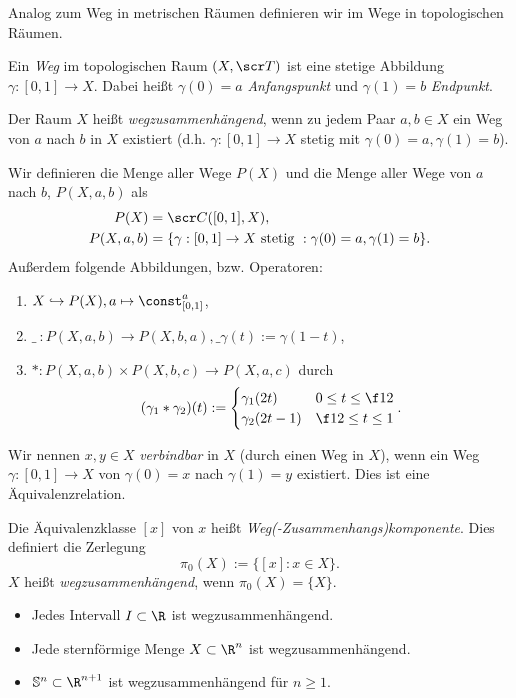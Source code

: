 Analog zum Weg in metrischen Räumen definieren wir im Wege in topologischen Räumen.

\begin{df}
	Ein \emph{Weg} im topologischen Raum $(X, \scr T)$ ist eine stetige Abbildung $\gamma: [0,1] \to X$.
	Dabei heißt $\gamma(0) = a$ \emph{Anfangspunkt} und $\gamma(1) = b$ \emph{Endpunkt}.

	Der Raum $X$ heißt \emph{wegzusammenhängend}, wenn zu jedem Paar $a,b \in X$ ein Weg von $a$ nach $b$ in $X$ existiert (d.h. $\gamma:[0,1] \to X$ stetig mit $\gamma(0) = a, \gamma(1) = b$).

	Wir definieren die Menge aller Wege $P(X)$ und die Menge aller Wege von $a$ nach $b$, $P(X, a, b)$ als
	\begin{align*}
		P(X) &= \scr C ([0,1], X), \\
		P(X, a, b) &= \{ \gamma : [0,1] \to X \text{ stetig } : \gamma(0) = a, \gamma(1) = b \}.
	\end{align*}
	Außerdem folgende Abbildungen, bzw. Operatoren:
	\begin{enumerate}[1)]
		\item
			$X \injto P(X), a \mapsto \const_{[0,1]}^a$,
		\item
			$\_\  : P(X, a, b) \to P(X, b, a), \_\gamma(t) := \gamma(1-t)$,
		\item
			$\ast: P(X, a, b) \times P(X, b, c) \to P(X, a, c)$ durch
			\[
				(\gamma_1 \ast \gamma_2)(t) := \begin{cases}
					\gamma_1 (2t) & 0 \le t \le \f 12 \\
					\gamma_2 (2t - 1) & \f 12 \le t \le 1
				\end{cases}.
			\]
	\end{enumerate}
\end{df}

\begin{df}
	Wir nennen $x,y \in X$ \emph{verbindbar} in $X$ (durch einen Weg in $X$), wenn ein Weg $\gamma: [0,1] \to X$ von $\gamma(0) = x$ nach $\gamma(1) = y$ existiert.
	Dies ist eine Äquivalenzrelation.

	Die Äquivalenzklasse $[x]$ von $x$ heißt \emph{Weg(-Zusammenhangs)komponente}.
	Dies definiert die Zerlegung
	\[
		\pi_0 (X) := \{ [x] : x \in X \}.
	\]
	$X$ heißt \emph{wegzusammenhängend}, wenn $\pi_0(X) = \{X\}$.
\end{df}

\begin{ex}
	\begin{itemize}
		\item
			Jedes Intervall $I \subset \R$ ist wegzusammenhängend.
		\item
			Jede sternförmige Menge $X \subset \R^n$ ist wegzusammenhängend.
		\item
			$\S^n \subset \R^{n+1}$ ist wegzusammenhängend für $n \ge 1$.
	\end{itemize}
\end{ex}

